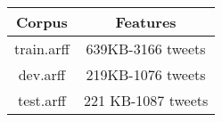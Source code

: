 
 \begin{tabular}{|c|c|} 
 \hline
 Corpus & Features \\ [0.5ex] 
 \hline\hline
 train.arff & 639KB-3166 tweets \\ 
\hline
dev.arff & 219KB-1076 tweets \\
 \hline
 test.arff & 221 KB-1087 tweets \\
 \hline
\end{tabular}